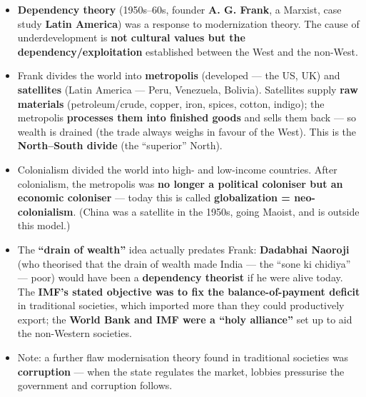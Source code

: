 \begin{KeyConcept}
\begin{itemize}
    \item \textbf{Dependency theory} (1950s--60s, founder \textbf{A. G. Frank}, a Marxist, case study \textbf{Latin America}) was a response to modernization theory. The cause of underdevelopment is \textbf{not cultural values but the dependency/exploitation} established between the West and the non-West.
    \item Frank divides the world into \textbf{metropolis} (developed --- the US, UK) and \textbf{satellites} (Latin America --- Peru, Venezuela, Bolivia). Satellites supply \textbf{raw materials} (petroleum/crude, copper, iron, spices, cotton, indigo); the metropolis \textbf{processes them into finished goods} and sells them back --- so wealth is drained (the trade always weighs in favour of the West). This is the \textbf{North--South divide} (the ``superior'' North).
\end{itemize}
\end{KeyConcept}

\begin{KeyConcept}
\begin{itemize}
    \item Colonialism divided the world into high- and low-income countries. After colonialism, the metropolis was \textbf{no longer a political coloniser but an economic coloniser} --- today this is called \textbf{globalization = neo-colonialism}. (China was a satellite in the 1950s, going Maoist, and is outside this model.)
    \item The \textbf{``drain of wealth''} idea actually predates Frank: \textbf{Dadabhai Naoroji} (who theorised that the drain of wealth made India --- the ``sone ki chidiya'' --- poor) would have been a \textbf{dependency theorist} if he were alive today. The \textbf{IMF's stated objective was to fix the balance-of-payment deficit} in traditional societies, which imported more than they could productively export; the \textbf{World Bank and IMF were a ``holy alliance''} set up to aid the non-Western societies.
    \item Note: a further flaw modernisation theory found in traditional societies was \textbf{corruption} --- when the state regulates the market, lobbies pressurise the government and corruption follows.
\end{itemize}
\end{KeyConcept}

